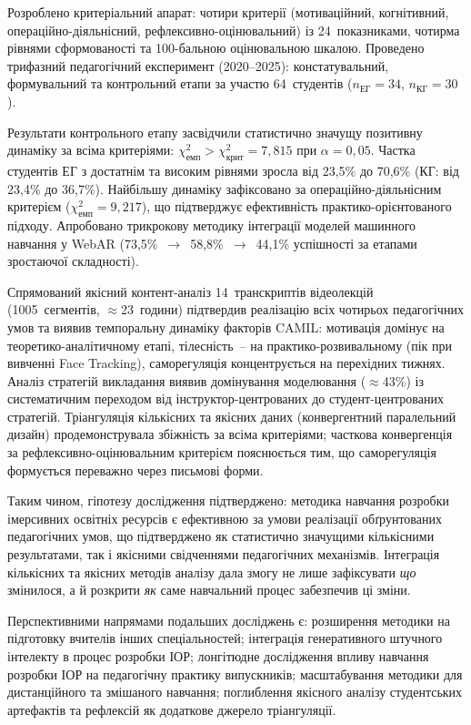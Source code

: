 \begin{enumerate}[label=\arabic*.]
Розроблено критеріальний апарат: чотири критерії (мотиваційний, когнітивний, операційно-діяльнісний, рефлексивно-оцінювальний) із 24~показниками, чотирма рівнями сформованості та 100-бальною оцінювальною шкалою. Проведено трифазний педагогічний експеримент (2020--2025): констатувальний, формувальний та контрольний етапи за участю 64~студентів ($n_{\text{ЕГ}} = 34$, $n_{\text{КГ}} = 30$).

Результати контрольного етапу засвідчили статистично значущу позитивну динаміку за всіма критеріями: $\chi^2_{\text{емп}} > \chi^2_{\text{крит}} = 7{,}815$ при $\alpha = 0{,}05$. Частка студентів ЕГ з достатнім та високим рівнями зросла від 23,5\% до 70,6\% (КГ: від 23,4\% до 36,7\%). Найбільшу динаміку зафіксовано за операційно-діяльнісним критерієм ($\chi^2_{\text{емп}} = 9{,}217$), що підтверджує ефективність практико-орієнтованого підходу. Апробовано трикрокову методику інтеграції моделей машинного навчання у WebAR (73,5\%~$\to$~58,8\%~$\to$~44,1\% успішності за етапами зростаючої складності).

Спрямований якісний контент-аналіз 14~транскриптів відеолекцій (1005~сегментів, $\approx$23~години) підтвердив реалізацію всіх чотирьох педагогічних умов та виявив темпоральну динаміку факторів CAMIL: мотивація домінує на теоретико-аналітичному етапі, тілесність~-- на практико-розвивальному (пік при вивченні Face Tracking), саморегуляція концентрується на перехідних тижнях. Аналіз стратегій викладання виявив домінування моделювання ($\approx$43\%) із систематичним переходом від інструктор-центрованих до студент-центрованих стратегій. Тріангуляція кількісних та якісних даних (конвергентний паралельний дизайн) продемонструвала збіжність за всіма критеріями; часткова конвергенція за рефлексивно-оцінювальним критерієм пояснюється тим, що саморегуляція формується переважно через письмові форми.

\end{enumerate}

Таким чином, гіпотезу дослідження підтверджено: методика навчання розробки імерсивних освітніх ресурсів є ефективною за умови реалізації обґрунтованих педагогічних умов, що підтверджено як статистично значущими кількісними результатами, так і якісними свідченнями педагогічних механізмів. Інтеграція кількісних та якісних методів аналізу дала змогу не лише зафіксувати \textit{що} змінилося, а й розкрити \textit{як} саме навчальний процес забезпечив ці зміни.

Перспективними напрямами подальших досліджень є: розширення методики на підготовку вчителів інших спеціальностей; інтеграція генеративного штучного інтелекту в процес розробки ІОР; лонгітюдне дослідження впливу навчання розробки ІОР на педагогічну практику випускників; масштабування методики для дистанційного та змішаного навчання; поглиблення якісного аналізу студентських артефактів та рефлексій як додаткове джерело тріангуляції.

\label{end_main_text}

